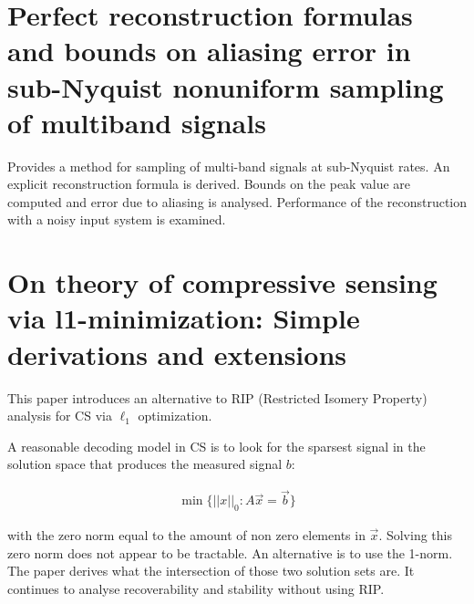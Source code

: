 \documentclass[report, oneside, a4paper, openany]{memoir}
\begin{document}
\section{Perfect reconstruction formulas and bounds on aliasing error in sub-Nyquist nonuniform sampling of multiband signals \cite{venkataramani2000perfect}}
Provides a method for sampling of multi-band signals at sub-Nyquist rates. An explicit reconstruction formula is derived.
Bounds on the peak value are computed and error due to aliasing is analysed.
Performance of the reconstruction with a noisy input system is examined.
\section{On theory of compressive sensing via l1-minimization: Simple derivations and extensions \cite{zhang2008theory}}
This paper introduces an alternative to RIP (Restricted Isomery Property) analysis for CS via $\ell_1$ optimization.




A reasonable decoding model in CS is to look for the sparsest signal
in the solution space that produces the measured signal $b$:

\begin{align*}
	\min \{ ||x||_0 : A\vec{x} = \vec{b} \}
\end{align*}

\noindent with the zero norm equal to the amount of non zero elements in $\vec{x}$. Solving this zero norm does not appear to be tractable. An alternative is to use the 1-norm. The paper derives what the intersection of those two solution sets are. It continues to analyse recoverability and stability without using RIP.
\end{document}
